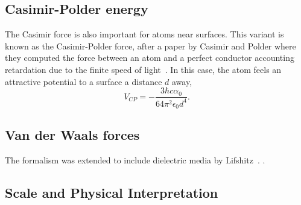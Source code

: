 \subsection{Casimir-Polder energy}

The Casimir force is also important for atoms near surfaces.  
This variant is known as the Casimir-Polder force, after a paper by Casimir and Polder where they computed the force between an atom and a perfect conductor accounting retardation due to the finite speed of light~\cite{CasimirPolder1948}.  
In this case, the atom feels an attractive potential to a surface a distance $d$ away,
\begin{equation}
V_{CP} =-\frac{3\hbar c\alpha_0}{64\pi^2\epsilon_0 d^4}.
\end{equation}


\subsection{Van der Waals forces}

The formalism was extended to include dielectric media by Lifshitz~\cite{Lifshitz1956}.  .  



\subsection{Scale and Physical Interpretation}


